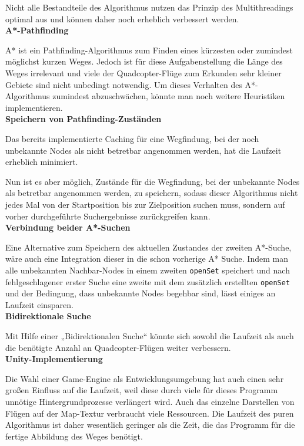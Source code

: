 \documentclass[a4paper,12pt]{article}
\newcommand{\code}{\texttt}
\begin{document}
Nicht alle Bestandteile des Algorithmus nutzen das Prinzip des Multithreadings optimal aus und können daher noch erheblich verbessert werden.
\\[0.4cm]
\textbf{A*-Pathfinding}

A* ist ein Pathfinding-Algorithmus zum Finden eines kürzesten oder zumindest möglichst kurzen Weges. Jedoch ist für diese Aufgabenstellung die Länge des Weges irrelevant und viele der Quadcopter-Flüge zum Erkunden sehr kleiner Gebiete sind nicht unbedingt notwendig. Um dieses Verhalten des A*-Algorithmus zumindest abzuschwächen, könnte man noch weitere Heuristiken implementieren.
\\[0.4cm]
\textbf{Speichern von Pathfinding-Zuständen}

Das bereits implementierte Caching für eine Wegfindung, bei der noch unbekannte Nodes als nicht betretbar angenommen werden, hat die Laufzeit erheblich minimiert.

Nun ist es aber möglich, Zustände für die Wegfindung, bei der unbekannte Nodes als betretbar angenommen werden, zu speichern, sodass dieser Algorithmus nicht jedes Mal von der Startposition bis zur Zielposition suchen muss, sondern auf vorher durchgeführte Suchergebnisse zurückgreifen kann.
\\[0.4cm]
\textbf{Verbindung beider A*-Suchen}

Eine Alternative zum Speichern des aktuellen Zustandes der zweiten A*-Suche, wäre auch eine Integration dieser in die schon vorherige A* Suche. Indem man alle unbekannten Nachbar-Nodes in einem zweiten \code{openSet} speichert und nach fehlgeschlagener erster Suche eine zweite mit dem zusätzlich erstellten \code{openSet} und der Bedingung, dass unbekannte Nodes begehbar sind, lässt einiges an Laufzeit einsparen.
\\[0.4cm]
\textbf{Bidirektionale Suche}

Mit Hilfe einer „Bidirektionalen Suche“ \cite{bidi_search} könnte sich sowohl die Laufzeit als auch die benötigte Anzahl an Quadcopter-Flügen weiter verbessern.
\\[0.4cm]
\textbf{Unity-Implementierung}

Die Wahl einer Game-Engine als Entwicklungsumgebung hat auch einen sehr großen Einfluss auf die Laufzeit, weil diese durch viele für dieses Programm unnötige Hintergrundprozesse verlängert wird. Auch das einzelne Darstellen von Flügen auf der Map-Textur verbraucht viele Ressourcen. Die Laufzeit des puren Algorithmus ist daher wesentlich geringer als die Zeit, die das Programm für die fertige Abbildung des Weges benötigt.
\end{document}
